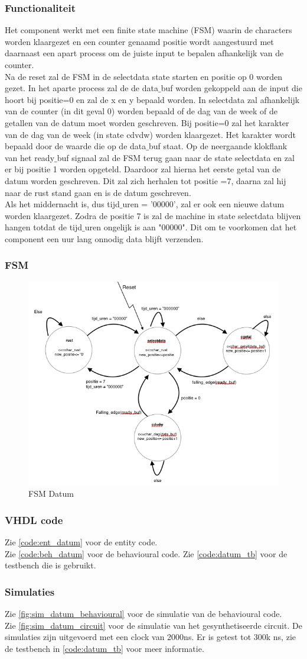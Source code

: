 \subsubsection{Functionaliteit}
Het component werkt met een finite state machine (FSM) waarin de characters worden klaargezet en een counter genaamd positie wordt aangestuurd met daarnaast een apart process om de juiste input te bepalen afhankelijk van de counter. \\
Na de reset zal de FSM in de selectdata state starten en positie op 0 worden gezet. 
In het aparte process zal de de data$\_$buf worden gekoppeld aan de input die hoort bij positie=0 en zal de x en y bepaald worden. 
 In selectdata zal  afhankelijk van de counter (in dit geval 0) worden bepaald of de dag van de week of de getallen van de datum moet worden geschreven. Bij positie=0 zal het karakter van de dag van de week (in state cdvdw) worden klaargezet. Het karakter wordt bepaald door de waarde die op de data$\_$buf staat. Op de neergaande klokflank van het ready$\_$buf signaal zal de FSM terug gaan naar de state selectdata en zal er bij positie 1 worden opgeteld. Daardoor zal hierna het eerste getal van de datum worden geschreven. Dit zal zich herhalen tot positie =7, daarna zal hij naar de rust stand gaan en is de datum geschreven. \\
 Als het middernacht is, dus tijd$\_$uren = '00000', zal er ook een nieuwe datum worden klaargezet. Zodra de positie 7 is zal de machine in state selectdata blijven hangen totdat de tijd$\_$uren ongelijk is aan "00000". Dit om te voorkomen dat het component een uur lang onnodig data blijft verzenden. 


\subsubsection{FSM}
\begin{figure}
  \centering
     \includegraphics[angle = 0, scale= 0.6]{verslag_schemas/datum_fsm.png}
       \caption{FSM Datum}
\label{fig:simlayout}
\end{figure}

\subsubsection{VHDL code}
Zie \ref{code:ent_datum} voor de entity code. \\
Zie \ref{code:beh_datum} voor de behavioural code.
Zie \ref{code:datum_tb} voor de testbench die is gebruikt.
\subsubsection{Simulaties}
Zie \ref{fig:sim_datum_behavioural} voor de simulatie van de behavioural code. \\
Zie \ref{fig:sim_datum_circuit} voor de simulatie van het gesynthetiseerde circuit. 
De simulaties zijn uitgevoerd met een clock van 2000ns.  Er is getest tot 300k ns, zie de testbench in \ref{code:datum_tb} voor meer informatie.

